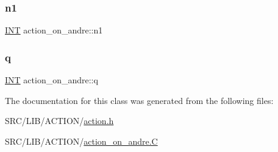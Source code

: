 \subsubsection{\texorpdfstring{n1}{n1}}
{\footnotesize\ttfamily \mbox{\hyperlink{galois_8h_a09fddde158a3a20bd2dcadb609de11dc}{I\+NT}} action\+\_\+on\+\_\+andre\+::n1}

\mbox{\label{classaction__on__andre_ac7818152ccd1075dea85f92543c2732c}} 
\subsubsection{\texorpdfstring{q}{q}}
{\footnotesize\ttfamily \mbox{\hyperlink{galois_8h_a09fddde158a3a20bd2dcadb609de11dc}{I\+NT}} action\+\_\+on\+\_\+andre\+::q}



The documentation for this class was generated from the following files\+:\begin{DoxyCompactItemize}
\item 
S\+R\+C/\+L\+I\+B/\+A\+C\+T\+I\+O\+N/\mbox{\hyperlink{action_8h}{action.\+h}}\item 
S\+R\+C/\+L\+I\+B/\+A\+C\+T\+I\+O\+N/\mbox{\hyperlink{action__on__andre_8_c}{action\+\_\+on\+\_\+andre.\+C}}\end{DoxyCompactItemize}
